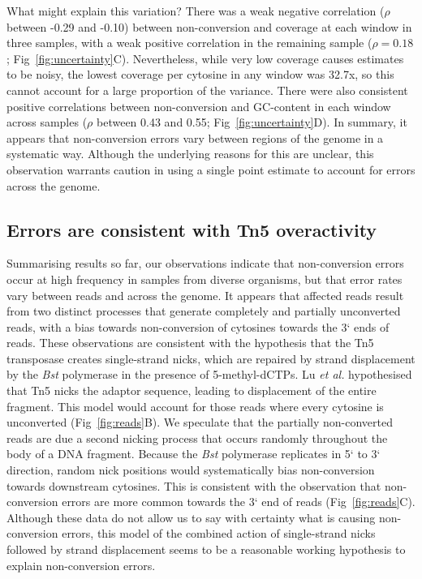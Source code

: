 \documentclass[10pt,letterpaper]{article}
\begin{document}
What might explain this variation?
There was a weak negative correlation ($\rho$ between -0.29 and -0.10) between non-conversion and coverage at each window in three samples, with a weak positive correlation in the remaining sample ($\rho = 0.18$; Fig~\ref{fig:uncertainty}C).
Nevertheless, while very low coverage causes estimates to be noisy, the lowest coverage per cytosine in any window was 32.7x, so this cannot account for a large proportion of the variance.
There were also consistent positive correlations between non-conversion and GC-content in each window across samples ($\rho$ between 0.43 and 0.55; Fig~\ref{fig:uncertainty}D).
In summary, it appears that non-conversion errors vary between regions of the genome in a systematic way.
Although the underlying reasons for this are unclear, this observation warrants caution in using a single point estimate to account for errors across the genome.

\subsection*{Errors are consistent with Tn5 overactivity}

Summarising results so far, our observations indicate that non-conversion errors occur at high frequency in samples from diverse organisms, but that error rates vary between reads and across the genome.
It appears that affected reads result from two distinct processes that generate completely and partially unconverted reads, with a bias towards non-conversion of cytosines towards the 3` ends of reads.
These observations are consistent with the hypothesis that the Tn5 transposase creates single-strand nicks, which are repaired by strand displacement by the \textit{Bst} polymerase in the presence of 5-methyl-dCTPs.
Lu \textit{et al.} \cite{lu2015improved} hypothesised that Tn5 nicks the adaptor sequence, leading to displacement of the entire fragment.
This model would account for those reads where every cytosine is unconverted (Fig~\ref{fig:reads}B).
We speculate that the partially non-converted reads are due a second nicking process that occurs randomly throughout the body of a DNA fragment.
Because the \textit{Bst} polymerase replicates in 5` to 3` direction, random nick positions would systematically bias non-conversion towards downstream cytosines.
This is consistent with the observation that non-conversion errors are more common towards the 3` end of reads (Fig~\ref{fig:reads}C).
Although these data do not allow us to say with certainty what is causing non-conversion errors, this model of the combined action of single-strand nicks followed by strand displacement seems to be a reasonable working hypothesis to explain non-conversion errors.
\end{document}
